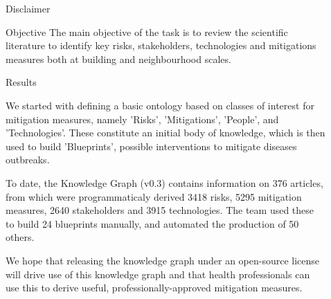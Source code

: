 \documentclass[final]{beamer}
\newlength{\sepwid}
\newlength{\onecolwid}
\begin{document}
\begin{frame}[t]
\begin{columns}[t]
\begin{column}{\onecolwid}
\begin{block}{Disclaimer}
          \end{block}
          
          \begin{block}{Objective}
The main objective of the task is to review the scientific literature to identify key risks, stakeholders, technologies and mitigations measures both at building and neighbourhood scales.

          \end{block}
          
          
          \begin{block}{Results}

We started with defining a basic ontology based on classes of interest for mitigation measures, namely 'Risks', 'Mitigations', 'People', and 'Technologies'. These constitute an initial body of knowledge, which is then used to build 'Blueprints', possible interventions to mitigate diseases outbreaks.

To date, the Knowledge Graph (v0.3) contains information on 376 articles, from which were programmaticaly derived 3418 risks, 5295 mitigation measures, 2640 stakeholders and 3915 technologies. The team used these to build 24 blueprints manually, and automated the production of 50 others.

We hope that releasing the knowledge graph under an open-source license will drive use of this knowledge graph and that health professionals can use this to derive useful, professionally-approved mitigation measures.

          \end{block}
         
         \end{column}
                  
                  
         \begin{column}{\sepwid}  \end{column}
         
         
         
         
         \begin{column}{\onecolwid} %
         

\end{column}
\end{columns}
\end{frame}
\end{document}
